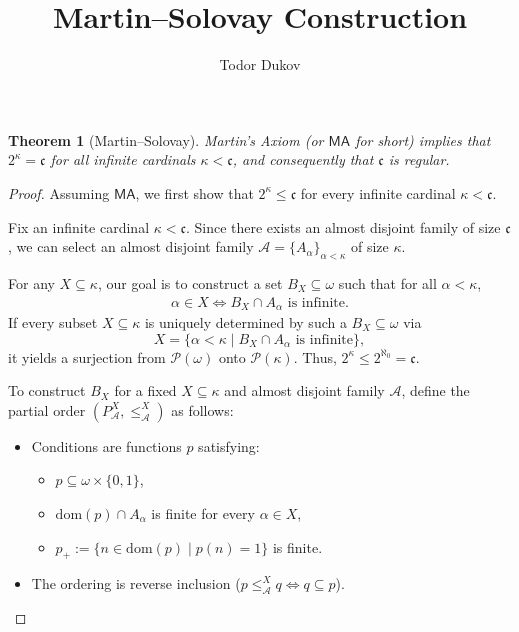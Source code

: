 \documentclass[12pt]{article}
\title{Martin--Solovay Construction}
\author{Todor Dukov}
\newcommand{\calA}{\mathcal{A}}
\newcommand{\MA}{\mathsf{MA}}
\newtheorem*{theorem}{Theorem}
\begin{document}
\maketitle

\begin{theorem}[Martin--Solovay]
  Martin's Axiom (or $\MA$ for short) implies that $2^\kappa = \mathfrak{c}$ for all infinite cardinals $\kappa < \mathfrak{c}$, and consequently that $\mathfrak{c}$ is regular.
\end{theorem}

\begin{proof}
  Assuming $\MA$, we first show that $2^\kappa \le \mathfrak{c}$ for every infinite cardinal $\kappa < \mathfrak{c}$. 

  Fix an infinite cardinal $\kappa < \mathfrak{c}$.
  Since there exists an almost disjoint family of size $\mathfrak{c}$, we can select an almost disjoint family $\calA = \{ A_\alpha\}_{\alpha < \kappa}$ of size $\kappa$.

  For any $X \subseteq \kappa$, our goal is to construct a set $B_X \subseteq \omega$ such that for all $\alpha < \kappa$,
  \begin{align*}
    \alpha \in X \iff B_X \cap A_\alpha \text{ is infinite.} \tag{$\ast$} \label{coding}
  \end{align*}
  If every subset $X \subseteq \kappa$ is uniquely determined by such a $B_X \subseteq \omega$ via
  \[
    X = \{ \alpha < \kappa \mid B_X \cap A_\alpha \text{ is infinite} \},
  \]
  it yields a surjection from $\mathcal{P}(\omega)$ onto $\mathcal{P}(\kappa)$. Thus, $2^\kappa \le 2^{\aleph_0} = \mathfrak{c}$.

  To construct $B_X$ for a fixed $X \subseteq \kappa$ and almost disjoint family $\calA$, define the partial order $(P_\calA^X, \le_\calA^X)$ as follows:
  \begin{itemize}
    \item Conditions are functions $p$ satisfying:
      \begin{itemize}
        \item $p \subseteq \omega \times \{0, 1\}$,
        \item $\mathrm{dom}(p) \cap A_\alpha$ is finite for every $\alpha \in X$,
        \item $p_+ := \{ n \in \mathrm{dom}(p) \mid p(n) = 1 \}$ is finite.
      \end{itemize}
    \item The ordering is reverse inclusion ($p \le_\calA^X q \iff q \subseteq p$).
  \end{itemize}


\end{proof}
\end{document}
